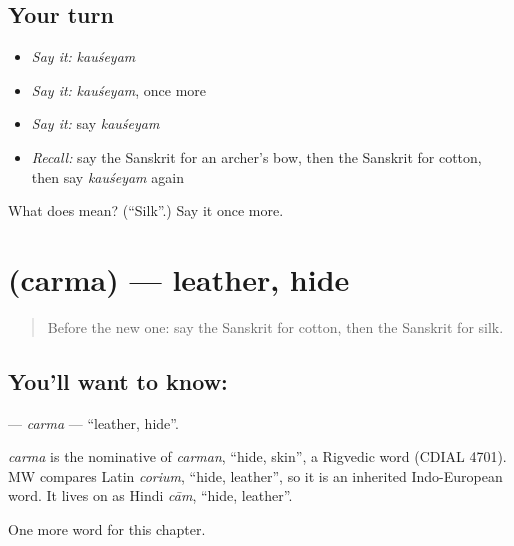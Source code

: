 \subsection*{Your turn}
\begin{itemize}
\raggedright
  \item \emph{Say it:} \emph{kauśeyam}
  \item \emph{Say it:} \emph{kauśeyam}, once more
  \item \emph{Say it:} say \emph{kauśeyam}
  \item \emph{Recall:} say the Sanskrit for an archer's bow, then the Sanskrit for cotton, then say \emph{kauśeyam} again
\end{itemize}

\begin{tcolorbox}[breakable,colback=teal!4,colframe=teal!35!black,title={Before you move on}]
What does  mean? (\textquotedblleft{}Silk\textquotedblright{}.) Say it once more.
\end{tcolorbox}
\section[\texorpdfstring{\sk{चर्म} (carma)}{चर्म (carma)}]{ (carma) — leather, hide}

\label{lesson:SA-C221-carma}



\begin{quote}
Before the new one: say the Sanskrit for cotton, then the Sanskrit for silk.
\end{quote}

\subsection*{You'll want to know: }
\textbf{} — \emph{carma} — \textquotedblleft{}leather, hide\textquotedblright{}.

\begin{cousinweb}
\emph{carma} is the nominative of \emph{carman}, \textquotedblleft{}hide, skin\textquotedblright{}, a Rigvedic word (CDIAL 4701). MW compares Latin \emph{corium}, \textquotedblleft{}hide, leather\textquotedblright{}, so it is an inherited Indo-European word. It lives on as Hindi \emph{cām}, \textquotedblleft{}hide, leather\textquotedblright{}.
\end{cousinweb}

\begin{grammarlens}[title={What you've built}]
One more word for this chapter.
\end{grammarlens}

